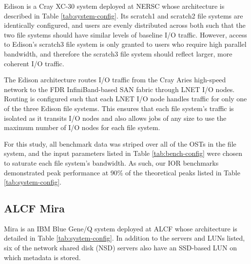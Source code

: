 Edison is a Cray XC-30 system deployed at NERSC whose architecture is described in Table \ref{tab:system-config}.
Its scratch1 and scratch2 file systems are identically configured, and users are evenly distributed across both such that the two file systems should have similar levels of baseline I/O traffic.
However, access to Edison's scratch3 file system is only granted to users who require high parallel bandwidth, and therefore the scratch3 file system should reflect larger, more coherent I/O traffic.

The Edison architecture routes I/O traffic from the Cray Aries high-speed network to the FDR InfiniBand-based SAN fabric through LNET I/O nodes.
Routing is configured such that each LNET I/O node handles traffic for only one of the three Edison file systems.
This ensures that each file system's traffic is isolated as it transits I/O nodes and also allows jobs of any size to use the maximum number of I/O nodes for each file system.

For this study, all benchmark data was striped over all of the OSTs in the file system, and the input parameters listed in Table \ref{tab:bench-config} were chosen to saturate each file system's bandwidth.
As such, our IOR benchmarks demonstrated peak performance at 90\% of the theoretical peaks listed in Table \ref{tab:system-config}.

\subsection{ALCF Mira} \label{sec:platforms/mira}

Mira is an IBM Blue Gene/Q system deployed at ALCF whose architecture is detailed in Table \ref{tab:system-config}.
In addition to the servers and LUNs listed, six of the network shared disk (NSD) servers also have an SSD-based LUN on which metadata is stored.

